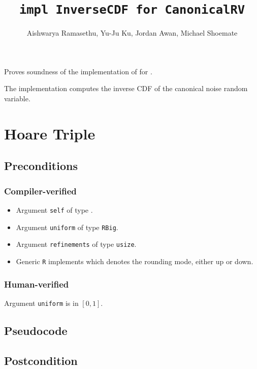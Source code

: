 \documentclass{article}
\title{\texttt{impl InverseCDF for CanonicalRV}}
\author{Aishwarya Ramasethu, Yu-Ju Ku, Jordan Awan, Michael Shoemate}
\begin{document}
\maketitle

\contrib

Proves soundness of the implementation of  
for .

The implementation computes the inverse CDF of the canonical noise random variable.

\section{Hoare Triple}

\subsection*{Preconditions}
\subsubsection*{Compiler-verified}
\begin{itemize}
    \item Argument \texttt{self} of type .
    \item Argument \texttt{uniform} of type \texttt{RBig}.
    \item Argument \texttt{refinements} of type \texttt{usize}.
    \item Generic \texttt{R} implements  which denotes the rounding mode, either up or down.
\end{itemize}

\subsubsection*{Human-verified}
Argument \texttt{uniform} is in $[0, 1]$.

\subsection*{Pseudocode}



\subsection*{Postcondition}
\end{document}
